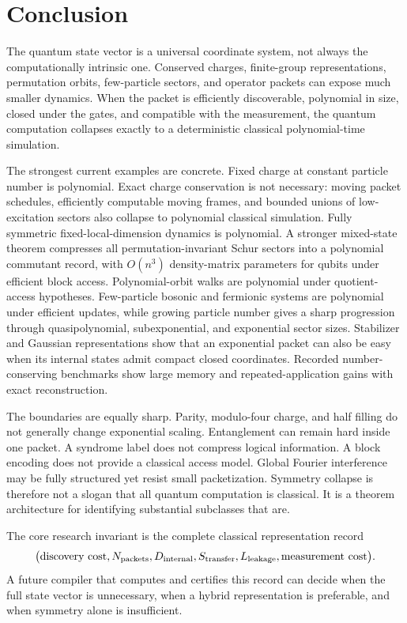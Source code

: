 \chapter{Conclusion}
The quantum state vector is a universal coordinate system, not always the computationally intrinsic one. Conserved charges, finite-group representations, permutation orbits, few-particle sectors, and operator packets can expose much smaller dynamics. When the packet is efficiently discoverable, polynomial in size, closed under the gates, and compatible with the measurement, the quantum computation collapses exactly to a deterministic classical polynomial-time simulation.

The strongest current examples are concrete. Fixed charge at constant particle number is polynomial. Exact charge conservation is not necessary: moving packet schedules, efficiently computable moving frames, and bounded unions of low-excitation sectors also collapse to polynomial classical simulation. Fully symmetric fixed-local-dimension dynamics is polynomial. A stronger mixed-state theorem compresses all permutation-invariant Schur sectors into a polynomial commutant record, with $O(n^3)$ density-matrix parameters for qubits under efficient block access. Polynomial-orbit walks are polynomial under quotient-access hypotheses. Few-particle bosonic and fermionic systems are polynomial under efficient updates, while growing particle number gives a sharp progression through quasipolynomial, subexponential, and exponential sector sizes. Stabilizer and Gaussian representations show that an exponential packet can also be easy when its internal states admit compact closed coordinates. Recorded number-conserving benchmarks show large memory and repeated-application gains with exact reconstruction.

The boundaries are equally sharp. Parity, modulo-four charge, and half filling do not generally change exponential scaling. Entanglement can remain hard inside one packet. A syndrome label does not compress logical information. A block encoding does not provide a classical access model. Global Fourier interference may be fully structured yet resist small packetization. Symmetry collapse is therefore not a slogan that all quantum computation is classical. It is a theorem architecture for identifying substantial subclasses that are.

The core research invariant is the complete classical representation record
\[
\bigl(
\text{discovery cost},
N_{\rm packets},
D_{\rm internal},
S_{\rm transfer},
L_{\rm leakage},
\text{measurement cost}
\bigr).
\]
A future compiler that computes and certifies this record can decide when the full state vector is unnecessary, when a hybrid representation is preferable, and when symmetry alone is insufficient.
